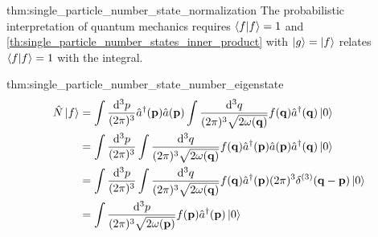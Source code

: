 \begin{delayedproof}{thm:single_particle_number_state_normalization}
	The probabilistic interpretation of quantum mechanics requires $\braket{f}=1$ and \cref{th:single_particle_number_states_inner_product} with $\ket{g}=\ket{f}$ relates $\braket{f}=1$ with the integral.
\end{delayedproof}
\begin{delayedproof}{thm:single_particle_number_state_number_eigenstate}
	\begin{equation*}
		\begin{split}
			\hat{N}
			\ket{f}
			&=
			\int\frac{\dd[3]{p}}{(2\pi)^3}
			\hat{a}^\dagger(\vb{p})
			\hat{a}(\vb{p})
			\int\frac{\dd[3]{q}}{(2\pi)^3\sqrt{2\omega(\vb{q})}}
			f(\vb{q})
			\hat{a}^\dagger(\vb{q})
			\ket{0}
			\\
			&=
			\int\frac{\dd[3]{p}}{(2\pi)^3}
			\int\frac{\dd[3]{q}}{(2\pi)^3\sqrt{2\omega(\vb{q})}}
			f(\vb{q})
			\hat{a}^\dagger(\vb{p})
			\hat{a}(\vb{p})
			\hat{a}^\dagger(\vb{q})
			\ket{0}
			\\
			&=
			\int\frac{\dd[3]{p}}{(2\pi)^3}
			\int\frac{\dd[3]{q}}{(2\pi)^3\sqrt{2\omega(\vb{q})}}
			f(\vb{q})
			\hat{a}^\dagger(\vb{p})
			(2\pi)^3
			\delta^{(3)}(\vb{q}-\vb{p})
			\ket{0}
			\\
			&=
			\int\frac{\dd[3]{p}}{(2\pi)^3\sqrt{2\omega(\vb{p})}}
			f(\vb{p})
			\hat{a}^\dagger(\vb{p})
			\ket{0}
		\end{split}
	\end{equation*}
\end{delayedproof}

